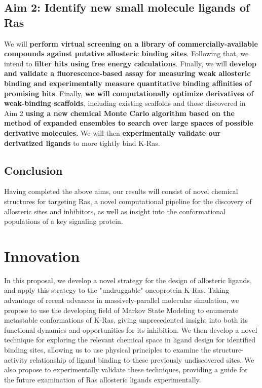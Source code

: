 \documentclass[12pt]{article}
\begin{document}
 \subsection*{Aim 2: Identify new small molecule ligands of Ras}
 We will \textbf{perform virtual screening on a library of commercially-available compounds against putative allosteric binding sites}. Following that, we intend to \textbf{filter hits using free energy calculations}.  Finally, we will  \textbf{develop and validate a fluorescence-based assay for measuring weak allosteric binding and experimentally measure quantitative binding affinities of promising hits}. Finally, \textbf{we will computationally optimize derivatives of weak-binding scaffolds}, including existing scaffolds and those discovered in Aim 2 \textbf{using a new chemical Monte Carlo algorithm based on the method of expanded ensembles to search over large spaces of possible derivative molecules.} We will then \textbf{experimentally validate our derivatized ligands} to more tightly bind K-Ras.
 
 \subsection*{Conclusion}
   Having completed the above aims, our results will consist of novel chemical structures for targeting Ras, a novel computational pipeline for the discovery of allosteric sites and inhibitors, as well as insight into the conformational populations of a key signaling protein. 
  
  
  
  
  
  
  
 \clearpage


\section*{Innovation}
In this proposal, we develop a novel strategy for the design of allosteric ligands, and apply this strategy to the "undruggable" oncoprotein K-Ras. Taking advantage of recent advances in massively-parallel molecular simulation, we propose to use the developing field of Markov State Modeling to enumerate metastable conformations of K-Ras, giving unprecedented insight into both its functional dynamics and opportunities for its inhibition. We then develop a novel technique for exploring the relevant chemical space in ligand design for identified binding sites, allowing us to use physical principles to examine the structure-activity relationship of ligand binding to these previously undiscovered sites. We also propose to experimentally validate these techniques, providing a guide for the future examination of Ras allosteric ligands experimentally.
\end{document}
